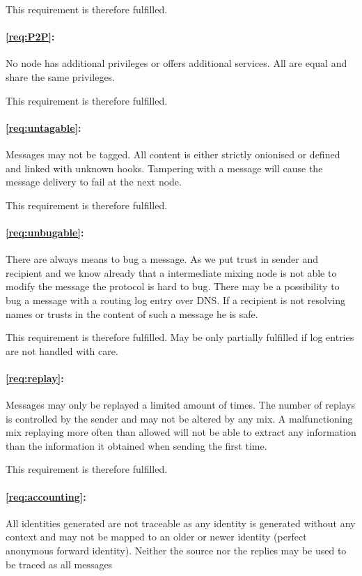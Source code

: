 This requirement is therefore fulfilled.

\paragraph*{\ref{req:P2P}:} 
No node has additional privileges or offers additional services. All are equal and share the same privileges.

This requirement is therefore fulfilled.

\paragraph*{\ref{req:untagable}:} 
Messages may not be tagged. All content is either strictly onionised or defined and linked with unknown hooks. Tampering with a message will cause the message delivery to fail at the next node.

This requirement is therefore fulfilled.
 
\paragraph*{\ref{req:unbugable}:} 
There are always means to bug a message. As we put trust in sender and recipient and we know already that a intermediate mixing node is not able to modify the message the protocol is hard to bug. There may be a possibility to bug a message with a routing log entry over DNS. If a recipient is not resolving names or trusts in the content of such a message he is safe.

This requirement is therefore fulfilled. May be only partially fulfilled if log entries are not handled with care.

\paragraph*{\ref{req:replay}:} Messages may only be replayed a limited amount of times. The number of replays is controlled by the sender and may not be altered by any mix. A malfunctioning mix replaying more often than allowed will not be able to extract any information than the information it obtained when sending the first time. 

This requirement is therefore fulfilled.

\paragraph*{\ref{req:accounting}:} 
All identities generated are not traceable as any identity is generated without any context and may not be mapped to an older or newer identity (perfect anonymous forward identity). Neither the source nor the replies may be used to be traced as all messages 

